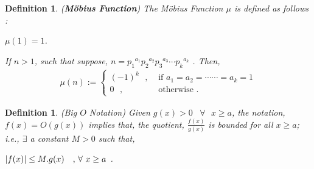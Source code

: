 \documentclass[article,12pt]{elsarticle}
\newtheorem{dfn}[thm]{Definition}
\begin{document}
	
	\begin{dfn}\label{def4}
		(\textbf{M\"{o}bius Function})  The M\"{o}bius Function $ \mu $ is defined as follows :
		\begin{center}
			$\mu(1) = 1$.
		\end{center}
		
		If $ n>1 $, such that suppose, $ n = {{p_{1}}^{a_{1}}}{{p_{2}}^{a_{2}}}{{p_{3}}^{a_{3}}}\cdots{{p_{k}}^{a_{k}}} $ . Then,
		\begin{eqnarray}\label{3}
			\mu(n) :=\left\{
			\begin{array}{cc}
				(-1)^{k}\mbox{ }, &\mbox{ if }a_{1} = a_{2} = \cdots\cdots = a_{k} = 1\\
				0\mbox{ }, &\mbox{ otherwise }.
			\end{array}
			\right.
		\end{eqnarray}
	\end{dfn} 
	\begin{dfn}\label{def5}
		(Big $O$ Notation)  Given $g(x) > 0\hspace{10pt} \forall \mbox{  }x\geq a$, the notation, $f(x) = O(g(x))$ implies that, the quotient, $\frac{f(x)}{g(x)}$ is bounded for all $x\geq a$;  i.e., $\exists$ a constant $M > 0$ such that,
		\begin{center}
			$\arrowvert f(x)\arrowvert \leq M.g(x)\hspace{10pt}\mbox{,  }\forall \mbox{  }x\geq a$ .
		\end{center}
	\end{dfn}
\end{document}
